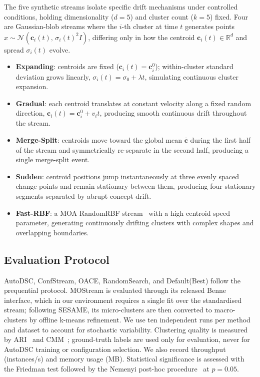 \documentclass[conference]{IEEEtran}
\begin{document}
The five synthetic streams isolate specific drift mechanisms under controlled conditions, holding dimensionality ($d{=}5$) and cluster count ($k{=}5$) fixed. Four are Gaussian-blob streams where the $i$-th cluster at time $t$ generates points $x \sim \mathcal{N}(\mathbf{c}_i(t),\,\sigma_i(t)^2 I)$, differing only in how the centroid $\mathbf{c}_i(t) \in \mathbb{R}^d$ and spread $\sigma_i(t)$ evolve.
\begin{itemize}
\item \textbf{Expanding}: centroids are fixed ($\mathbf{c}_i(t){=}\mathbf{c}_i^0$); within-cluster standard deviation grows linearly, $\sigma_i(t) = \sigma_0 + \lambda t$, simulating continuous cluster expansion.
\item \textbf{Gradual}: each centroid translates at constant velocity along a fixed random direction, $\mathbf{c}_i(t) = \mathbf{c}_i^0 + v_i t$, producing smooth continuous drift throughout the stream.
\item \textbf{Merge-Split}: centroids move toward the global mean $\bar{\mathbf{c}}$ during the first half of the stream and symmetrically re-separate in the second half, producing a single merge-split event.
\item \textbf{Sudden}: centroid positions jump instantaneously at three evenly spaced change points and remain stationary between them, producing four stationary segments separated by abrupt concept drift.
\item \textbf{Fast-RBF}: a MOA RandomRBF stream~\cite{bifet2010moa} with a high centroid speed parameter, generating continuously drifting clusters with complex shapes and overlapping boundaries.
\end{itemize}

\subsection{Evaluation Protocol}

AutoDSC, ConfStream, OACE, RandomSearch, and Default(Best) follow the prequential protocol. MOStream is evaluated through its released Benne interface, which in our environment requires a single fit over the standardised stream; following SESAME, its micro-clusters are then converted to macro-clusters by offline k-means refinement. We use ten independent runs per method and dataset to account for stochastic variability. Clustering quality is measured by ARI~\cite{hubert1985comparing} and CMM~\cite{kremer2011cmm}; ground-truth labels are used only for evaluation, never for AutoDSC training or configuration selection. We also record throughput (instances/s) and memory usage (MB). Statistical significance is assessed with the Friedman test followed by the Nemenyi post-hoc procedure~\cite{demvsar2006statistical} at $p=0.05$.
\end{document}

